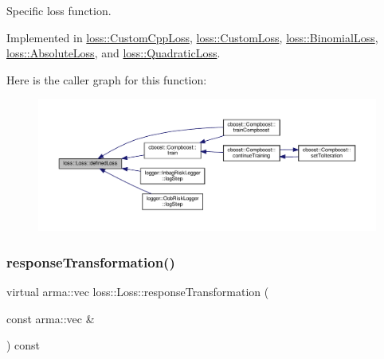 Specific loss function. 



Implemented in \mbox{\hyperlink{classloss_1_1_custom_cpp_loss_a5611805b67b0542449beb898051ab943}{loss\+::\+Custom\+Cpp\+Loss}}, \mbox{\hyperlink{classloss_1_1_custom_loss_a2a96bc5e4b4894bbaa64745a3f7c0fd5}{loss\+::\+Custom\+Loss}}, \mbox{\hyperlink{classloss_1_1_binomial_loss_aa4570a731257ba43b1b4d6099c0a4515}{loss\+::\+Binomial\+Loss}}, \mbox{\hyperlink{classloss_1_1_absolute_loss_acfef6f0de3cfcccebd4bbfc04133cf1e}{loss\+::\+Absolute\+Loss}}, and \mbox{\hyperlink{classloss_1_1_quadratic_loss_ae34f68243ffe021e309ed73a68796e1e}{loss\+::\+Quadratic\+Loss}}.

Here is the caller graph for this function\+:\nopagebreak
\begin{figure}[H]
\begin{center}
\leavevmode
\includegraphics[width=350pt]{classloss_1_1_loss_ae9f94dd9b8311397583ba3a9cb485e94_icgraph}
\end{center}
\end{figure}
\mbox{\label{classloss_1_1_loss_a0a84b7df79b08e40b538aaa7e6ee75c4}} 
\subsubsection{\texorpdfstring{response\+Transformation()}{responseTransformation()}}
{\footnotesize\ttfamily virtual arma\+::vec loss\+::\+Loss\+::response\+Transformation (\begin{DoxyParamCaption}\item[{const arma\+::vec \&}]{ }\end{DoxyParamCaption}) const\hspace{0.3cm}{\ttfamily [pure virtual]}}



